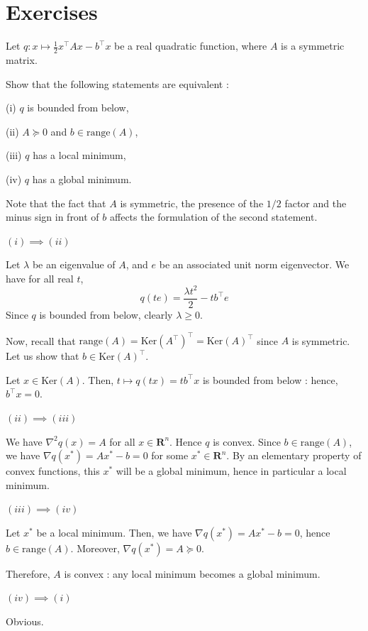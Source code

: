 \section{Exercises}

\begin{exercise}
    Let $ q : x \mapsto \frac 1 2 x^\top A x - b^\top x $ be a real quadratic function, where $ A $ is a symmetric matrix.

    Show that the following statements are equivalent :

    (i) $ q $ is bounded from below,
    
    (ii) $ A \succeq 0 $ and $ b \in \mathrm{range}(A) $,
    
    (iii) $ q $ has a local minimum,
    
    (iv)  $ q $ has a global minimum.
\end{exercise}

\begin{remark}
    Note that the fact that $ A $ is symmetric, the presence of the $ 1/2 $ factor and the minus sign in front of $ b $ affects the formulation of the second statement.
\end{remark}

\begin{solution}
    $ (i) \implies (ii) $

    Let $ \lambda $ be an eigenvalue of $ A $, and $ e $ be an associated unit norm eigenvector. We have for all real $ t $, 
    \[
        q(te) = \frac{\lambda t^2}{2} - t b^\top e
    \]
    Since $ q $ is bounded from below, clearly $ \lambda \geqslant 0 $.

    Now, recall that $ \mathrm{range}(A) = \mathrm{Ker}(A^\top)^\top = \mathrm{Ker}(A)^\top $ since $ A $ is symmetric. Let us show that $ b \in \mathrm{Ker}(A)^\top $.

    Let $ x \in \mathrm{Ker}(A) $. Then, $ t \mapsto q(tx) = t b^\top x $ is bounded from below : hence, $ b^\top x = 0 $.

    $ (ii) \implies (iii) $
    
    We have $ \nabla^2 q(x) = A $ for all $ x \in \mathbf R^n $. Hence $ q $ is convex. Since $ b \in \mathrm{range}(A) $, we have $ \nabla q(x^*) = Ax^* - b = 0 $ for some $ x^* \in \mathbf R^n $. By an elementary property of convex functions, this $ x^* $ will be a global minimum, hence in particular a local minimum.

    $ (iii) \implies (iv) $

    Let $ x^* $ be a local minimum. Then, we have $ \nabla q (x^*) = Ax^* - b = 0 $, hence $ b \in \mathrm{range}(A) $. Moreover, $ \nabla q(x^*) = A \succeq 0 $.
    
    Therefore, $ A $ is convex : any local minimum becomes a global minimum.

    $ (iv) \implies (i) $

    Obvious.
\end{solution}

